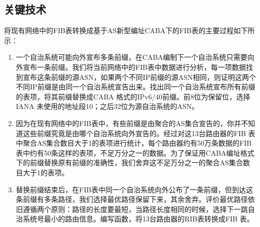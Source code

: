 \subsection{关键技术}
将现有网络中的FIB表转换成基于AS新型编址CABA下的FIB表的主要过程如下所示：
\begin{enumerate}
\item 一个自治系统可能向外宣布多条前缀，在CABA编制下一个自治系统只需要向外宣布一条前缀。我们将当前网络中的FIB表中数据进行分析，每一项数据找到宣布这条前缀的源ASN，如果两个不同IP前缀的源ASN相同，则证明这两个不同IP前缀是由同一个自治系统宣告出来。找出同一个自治系统宣布所有前缀的表项，将其前缀替换成CABA 格式的IPv6$/$40前缀。前8位为保留位，选择IANA 未使用的地址段10；之后32位为源自治系统的ASN。
\item 因为在现有网络中的FIB表中，有些前缀是由聚合的AS集合宣告的，你并不知道这些前缀究竟是由哪个自治系统向外宣告的。经过对这13台路由器的FIB 表中聚合AS集合数目大于1的表项进行统计，每个路由器约有50万条数据的FIB表中约有50条这样的表项，不足万分之一的数据。为了保证用CABA编址格式下的前缀替换原有前缀的准确性，我们舍弃这不足万分之一的聚合AS集合数目大于1的表项。
\item 替换前缀结束后，在FIB表中同一个自治系统向外公布了一条前缀，但到达这条前缀有多条路径，我们选择最优路径保留下来，其余舍弃。评价最优路径依旧遵循两个原则：路径的长度要最短，当路径长度相同的时候，选择下一跳自治系统号最小的路由信息。编写函数，将13台路由器的RIB表转换成FIB 表。
\end{enumerate}

